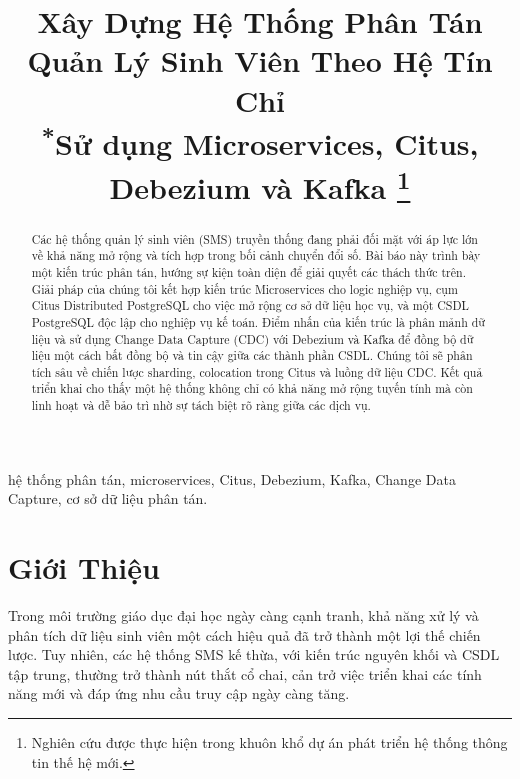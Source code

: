 \documentclass[conference]{IEEEtran}
\begin{document}
\title{Xây Dựng Hệ Thống Phân Tán Quản Lý Sinh Viên Theo Hệ Tín Chỉ\\
{\footnotesize \textsuperscript{*}Sử dụng Microservices, Citus, Debezium và Kafka}
\thanks{Nghiên cứu được thực hiện trong khuôn khổ dự án phát triển hệ thống thông tin thế hệ mới.}
}

\author{
}

\maketitle

\begin{abstract}
Các hệ thống quản lý sinh viên (SMS) truyền thống đang phải đối mặt với áp lực lớn về khả năng mở rộng và tích hợp trong bối cảnh chuyển đổi số. Bài báo này trình bày một kiến trúc phân tán, hướng sự kiện toàn diện để giải quyết các thách thức trên. Giải pháp của chúng tôi kết hợp kiến trúc Microservices cho logic nghiệp vụ, cụm Citus Distributed PostgreSQL cho việc mở rộng cơ sở dữ liệu học vụ, và một CSDL PostgreSQL độc lập cho nghiệp vụ kế toán. Điểm nhấn của kiến trúc là phân mảnh dữ liệu và sử dụng Change Data Capture (CDC) với Debezium và Kafka để đồng bộ dữ liệu một cách bất đồng bộ và tin cậy giữa các thành phần CSDL. Chúng tôi sẽ phân tích sâu về chiến lược sharding, colocation trong Citus và luồng dữ liệu CDC. Kết quả triển khai cho thấy một hệ thống không chỉ có khả năng mở rộng tuyến tính mà còn linh hoạt và dễ bảo trì nhờ sự tách biệt rõ ràng giữa các dịch vụ.
\end{abstract}

\begin{IEEEkeywords}
hệ thống phân tán, microservices, Citus, Debezium, Kafka, Change Data Capture, cơ sở dữ liệu phân tán.
\end{IEEEkeywords}

\section{Giới Thiệu}
Trong môi trường giáo dục đại học ngày càng cạnh tranh, khả năng xử lý và phân tích dữ liệu sinh viên một cách hiệu quả đã trở thành một lợi thế chiến lược. Tuy nhiên, các hệ thống SMS kế thừa, với kiến trúc nguyên khối và CSDL tập trung, thường trở thành nút thắt cổ chai, cản trở việc triển khai các tính năng mới và đáp ứng nhu cầu truy cập ngày càng tăng.
\end{document}
